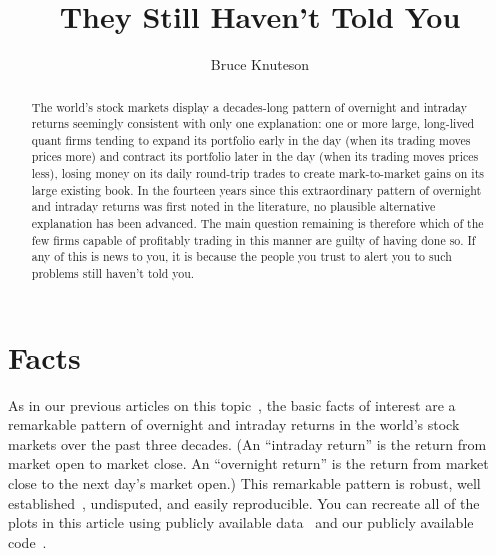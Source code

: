 \documentclass[twocolumn,twoside,prd,floatfix,letterpaper]{revtex4}
\def \citeKnuteson {\cite{knuteson2016,knuteson2018,knuteson2019,knuteson2020,knuteson2021}}
\def \citeAllOvernightIntradayLiterature {\cite{knuteson2016,knuteson2018,knuteson2019,knuteson2020,knuteson2021,cooper2008return,lachance2015night,qiao2020overnight,kelly2011returns,berkman2012paying,branch2012overnight,lou2019tug,bogousslavsky2021cross,lachance2020etfs}}
\begin{document}
\title{They Still Haven't Told You}
\author{Bruce Knuteson}
\noaffiliation

\begin{abstract}
The world's stock markets display a decades-long pattern of overnight and intraday returns seemingly consistent with only one explanation:  one or more large, long-lived quant firms tending to expand its portfolio early in the day (when its trading moves prices more) and contract its portfolio later in the day (when its trading moves prices less), losing money on its daily round-trip trades to create mark-to-market gains on its large existing book.  In the fourteen years since this extraordinary pattern of overnight and intraday returns was first noted in the literature, no plausible alternative explanation has been advanced.  The main question remaining is therefore which of the few firms capable of profitably trading in this manner are guilty of having done so.  If any of this is news to you, it is because the people you trust to alert you to such problems still haven't told you.
\end{abstract}

\maketitle

\vspace{-0.1in}

\tableofcontents


\section{Facts}

As in our previous articles on this topic~\citeKnuteson, the basic facts of interest are a remarkable pattern of overnight and intraday returns in the world's stock markets over the past three decades.  (An ``intraday return'' is the return from market open to market close.  An ``overnight return'' is the return from market close to the next day's market open.)  This remarkable pattern is robust, well established~\citeAllOvernightIntradayLiterature, undisputed, and easily reproducible.  You can recreate all of the plots in this article using publicly available data~\cite{yahooFinance} and our publicly available code~\cite{thisArticleWebpage}.
\end{document}
